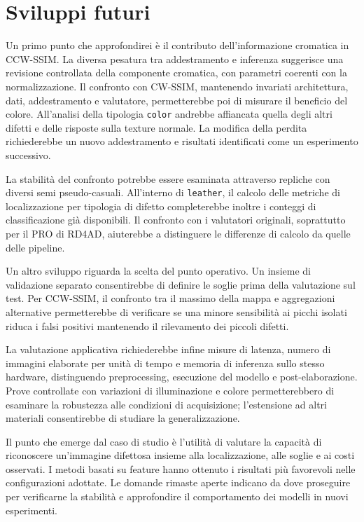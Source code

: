 \section{Sviluppi futuri}

Un primo punto che approfondirei è il contributo dell'informazione cromatica in CCW-SSIM. La diversa pesatura tra addestramento e inferenza suggerisce una revisione controllata della componente cromatica, con parametri coerenti con la normalizzazione. Il confronto con CW-SSIM, mantenendo invariati architettura, dati, addestramento e valutatore, permetterebbe poi di misurare il beneficio del colore. All'analisi della tipologia \texttt{color} andrebbe affiancata quella degli altri difetti e delle risposte sulla texture normale. La modifica della perdita richiederebbe un nuovo addestramento e risultati identificati come un esperimento successivo.

La stabilità del confronto potrebbe essere esaminata attraverso repliche con diversi semi pseudo-casuali. All'interno di \texttt{leather}, il calcolo delle metriche di localizzazione per tipologia di difetto completerebbe inoltre i conteggi di classificazione già disponibili. Il confronto con i valutatori originali, soprattutto per il PRO di RD4AD, aiuterebbe a distinguere le differenze di calcolo da quelle delle pipeline.

Un altro sviluppo riguarda la scelta del punto operativo. Un insieme di validazione separato consentirebbe di definire le soglie prima della valutazione sul test. Per CCW-SSIM, il confronto tra il massimo della mappa e aggregazioni alternative permetterebbe di verificare se una minore sensibilità ai picchi isolati riduca i falsi positivi mantenendo il rilevamento dei piccoli difetti.

La valutazione applicativa richiederebbe infine misure di latenza, numero di immagini elaborate per unità di tempo e memoria di inferenza sullo stesso hardware, distinguendo preprocessing, esecuzione del modello e post-elaborazione. Prove controllate con variazioni di illuminazione e colore permetterebbero di esaminare la robustezza alle condizioni di acquisizione; l'estensione ad altri materiali consentirebbe di studiare la generalizzazione.

Il punto che emerge dal caso di studio è l'utilità di valutare la capacità di riconoscere un'immagine difettosa insieme alla localizzazione, alle soglie e ai costi osservati. I metodi basati su feature hanno ottenuto i risultati più favorevoli nelle configurazioni adottate. Le domande rimaste aperte indicano da dove proseguire per verificarne la stabilità e approfondire il comportamento dei modelli in nuovi esperimenti.
